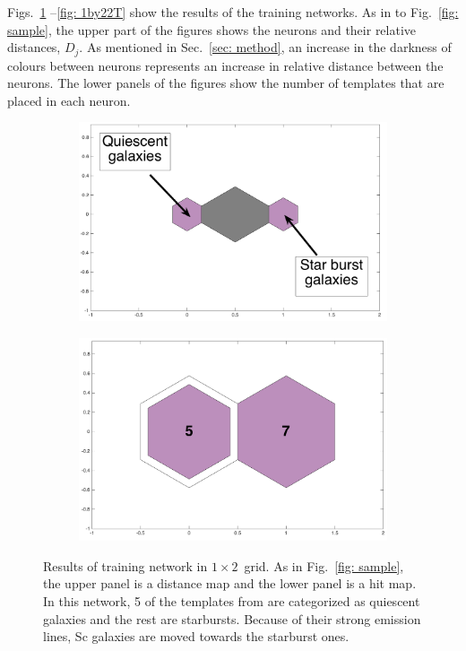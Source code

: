             Figs.~\ref{fig: 1by2T} --\ref{fig: 1by22T} show the results of the training networks.
            As in to Fig.~\ref{fig: sample}, the upper part of the figures shows the neurons and their relative distances, $D_j$.
            As mentioned in Sec.~\ref{sec: method}, an increase in the darkness of colours between neurons represents an increase in relative distance between the neurons.
            The lower panels of the figures show the number of  templates that are placed in each neuron. 
            \begin{figure}
                \begin{subfigure}[b]{0.5\textwidth}
                    \centering
                    \includegraphics[width=\textwidth]{../image_paper2/1d/dist_1_by_2.png}
                \end{subfigure}
                \hfill
                \begin{subfigure}[b]{0.5\textwidth}
                     \includegraphics[width=\textwidth]{../image_paper2/1d/hit_t_1_by_2.png}
                \end{subfigure}
                \caption{Results of training network in $1\times2$~grid. As in Fig.~\ref{fig: sample}, the upper panel is a distance map and the lower panel is a hit map. In this network, 5 of the templates from \citet{Kinney96} are categorized as quiescent galaxies and the rest are starbursts. Because of their strong emission lines, Sc galaxies are moved towards the starburst ones.}
                 \label{fig: 1by2T}
            \end{figure}
        
